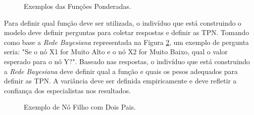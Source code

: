 \begin{figure}[ht!]
\begin{center}
	\end{center}
	\caption{Exemplos das Funções Ponderadas.}
	\label{fundamentacao:redes:construcao:funcoes:ponderadas}
\end{figure}

Para definir qual função deve ser utilizada, o indivíduo que está construindo o modelo deve definir perguntas para coletar respostas e definir as TPN. Tomando como base a \textit{Rede Bayesiana} representada na Figura \ref{fundamentacao:redes:construcao:funcoes:bn1}, um exemplo de pergunta seria: "Se o nó X1 for Muito Alto e o nó X2 for Muito Baixo, qual o valor esperado para o nó Y?". Baseado nas respostas, o indivíduo que está construindo a \textit{Rede Bayesiana} deve definir qual a função e quais os pesos adequados para definir as TPN. A variância deve ser definida empiricamente e deve refletir a confiança dos especialistas nos resultados.

\begin{figure}[ht!]
\begin{center}
	\end{center}
	\caption{Exemplo de Nó Filho com Dois Pais.}
	\label{fundamentacao:redes:construcao:funcoes:bn1}
\end{figure}

